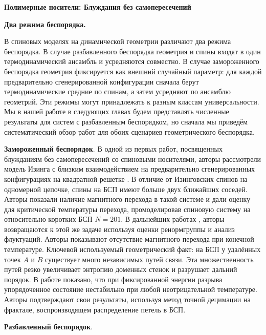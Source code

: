   \textbf{Полимерные носители: Блуждания без самопересечений}
  
  \textbf{Два режима беспорядка.}
 
В спиновых моделях на динамической геометрии различают два режима беспорядка.
В случае разбавленного беспорядка геометрия и спины входят в один термодинамический ансамбль и усредняются совместно.
В случае замороженного беспорядка геометрия фиксируется как внешний случайный параметр: для каждой предварительно сгенерированной конфигурации  сначала берут термодинамические средние по спинам, а затем усредняют по ансамблю геометрий. 
Эти режимы могут принадлежать к разным классам универсальности.
Мы в нашей работе в следующих главах будем представлять численные результаты для систем с разбавленным беспорядком, но сначала мы приведём систематический обзор работ для обоих сценариев геометрического беспорядка.




\textbf{Замороженный беспорядок}.
В одной из первых работ, посвященных блужданиям без самопересечений со спиновыми носителями, авторы рассмотрели модель Изинга с близким взаимодействием на предварительно сгенерированных конфигурациях на квадратной решетке \cite{Chakrabarti_1983}. 
В отличие от Изинговских спинов на одномерной цепочке, спины на БСП имеют больше двух ближайших соседей. 
Авторы показали наличие магнитного перехода в такой системе и дали оценку для критической температуры перехода, промоделировав спиновую систему на относительно коротких БСП  $N=201$. 
В дальнейших работах \cite{Chakrabarti_1985}, авторы  возвращаются к этой же задаче используя оценки ренормгруппы и анализ флуктуаций. 
Авторы  показывают отсутствие магнитного перехода при конечной температуре.   Ключевой используемый геометрический факт: на БСП у удалённых точек $A$ и $B$ существует много независимых путей связи. 
Эта множественность путей резко увеличивает энтропию доменных стенок и разрушает дальний порядок. 
В работе показано, что при фиксированной энергии разрыва  упорядоченное состояние нестабильно при любой неотрицательной температуре. 
Авторы подтверждают свои результаты, используя метод точной децимации на фрактале, воспроизводящем распределение петель в БСП. 



\textbf{Разбавленный беспорядок}.
 
